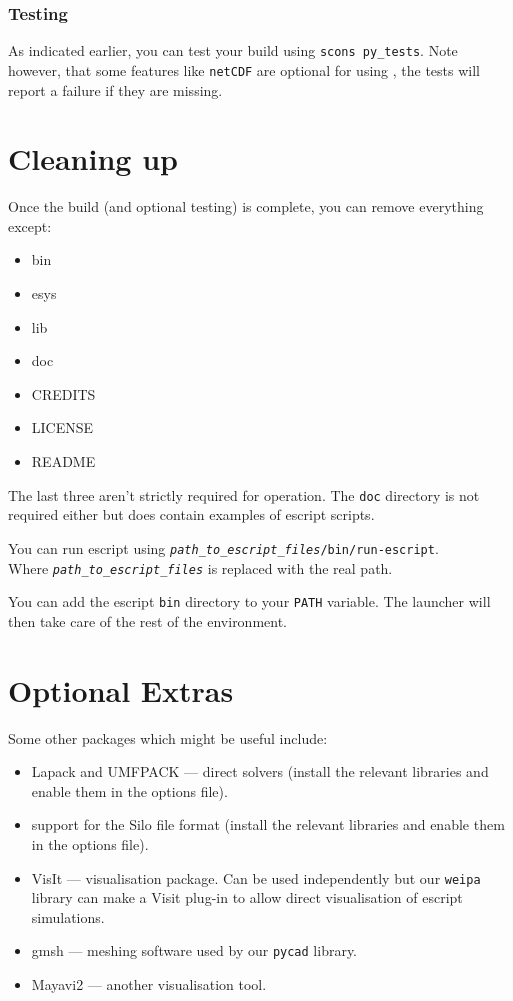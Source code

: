 \subsubsection{Testing}
As indicated earlier, you can test your build using \texttt{scons py_tests}.
Note however, that some features like \texttt{netCDF} are optional for using \escript, the tests will report a failure if
they are missing.

\section{Cleaning up}
\label{sec:cleanup}

Once the build (and optional testing) is complete, you can remove everything except:
\begin{itemize}
 \item bin
 \item esys
 \item lib
 \item doc
 \item CREDITS
 \item LICENSE
 \item README
\end{itemize}
The last three aren't strictly required for operation.
The \texttt{doc} directory is not required either but does contain examples of escript scripts.

You can run escript using \texttt{\textit{path_to_escript_files}/bin/run-escript}.\\
Where \texttt{\textit{path_to_escript_files}} is replaced with the real path.

\begin{optionalstep}
You can add the escript \texttt{bin} directory to your \texttt{PATH} variable.
The launcher will then take care of the rest of the environment.
\end{optionalstep}

\section{Optional Extras}

Some other packages which might be useful include:
\begin{itemize}
 \item Lapack and UMFPACK --- direct solvers (install the relevant libraries and enable them in the options file).
 \item support for the Silo file format (install the relevant libraries and enable them in the options file).
 \item VisIt --- visualisation package. Can be used independently but our \texttt{weipa} library can make a Visit
plug-in to allow direct visualisation of escript simulations.
 \item gmsh --- meshing software used by our \texttt{pycad} library.
 \item Mayavi2 --- another visualisation tool.
\end{itemize}


